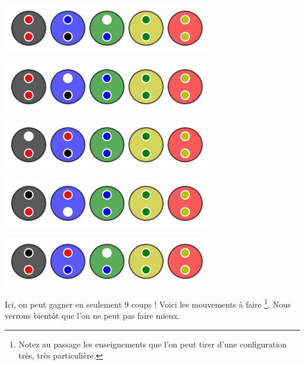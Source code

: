 \begin{multicols}{2}
    \columnbreak
    \begin{center}   %
        \includegraphics[scale= 0.45]{content/optimal/where_do_we_go/algo_bubble/005.png}

        \includegraphics[scale= 0.45]{content/optimal/where_do_we_go/algo_bubble/006.png}

        \includegraphics[scale= 0.45]{content/optimal/where_do_we_go/algo_bubble/007.png}

        \includegraphics[scale= 0.45]{content/optimal/where_do_we_go/algo_bubble/008.png}

        \includegraphics[scale= 0.45]{content/optimal/where_do_we_go/algo_bubble/009.png}
    \end{center}
\end{multicols}


\medskip

Ici, on peut gagner en seulement 9 coups ! Voici les mouvements à faire
\footnote{
    Notez au passage les enseignements que l'on peut tirer d'une configuration très, très particulière.
}.
Nous verrons bientôt que l'on ne peut pas faire mieux.

